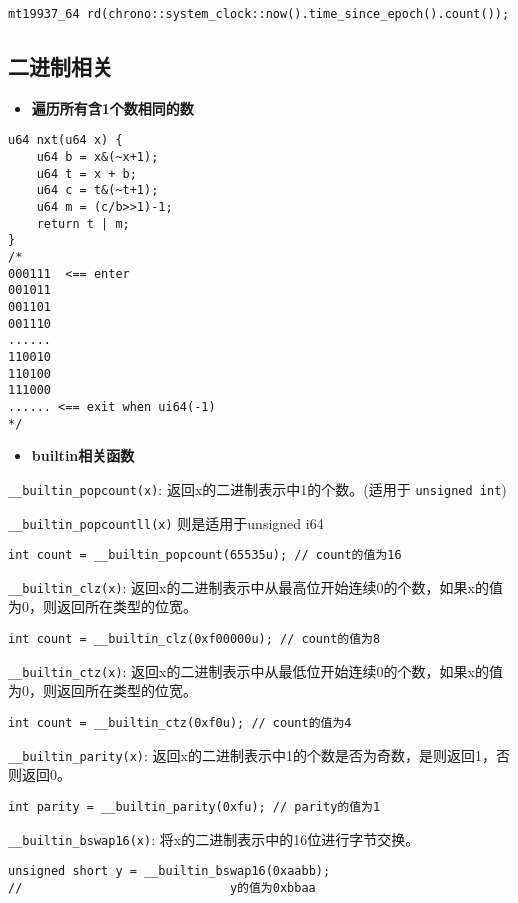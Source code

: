 \documentclass[a4paper,landscape,twocolumn]{ctexart}
\newcommand{\point}[1]{
	\begin{itemize}
		\item \textbf{#1}
	\end{itemize}
}
\begin{document}
\begin{lstlisting}
mt19937_64 rd(chrono::system_clock::now().time_since_epoch().count());
\end{lstlisting}

\subsection{二进制相关}

\point{遍历所有含1个数相同的数}

\begin{lstlisting}
u64 nxt(u64 x) {
	u64 b = x&(~x+1);
	u64 t = x + b;
	u64 c = t&(~t+1);
	u64 m = (c/b>>1)-1;
	return t | m;
}
/*
000111  <== enter
001011
001101
001110
......
110010
110100
111000
...... <== exit when ui64(-1)
*/
\end{lstlisting}

\point{builtin相关函数}

\texttt{\_\_builtin\_popcount(x)}: 返回x的二进制表示中1的个数。(适用于 \texttt{unsigned int})

\texttt{\_\_builtin\_popcountll(x)} 则是适用于unsigned i64

\begin{lstlisting}
int count = __builtin_popcount(65535u); // count的值为16
\end{lstlisting}

\texttt{\_\_builtin\_clz(x)}: 返回x的二进制表示中从最高位开始连续0的个数，如果x的值为0，则返回所在类型的位宽。

\begin{lstlisting}
int count = __builtin_clz(0xf00000u); // count的值为8
\end{lstlisting}

\texttt{\_\_builtin\_ctz(x)}: 返回x的二进制表示中从最低位开始连续0的个数，如果x的值为0，则返回所在类型的位宽。

\begin{lstlisting}
int count = __builtin_ctz(0xf0u); // count的值为4
\end{lstlisting}

\texttt{\_\_builtin\_parity(x)}: 返回x的二进制表示中1的个数是否为奇数，是则返回1，否则返回0。

\begin{lstlisting}
int parity = __builtin_parity(0xfu); // parity的值为1
\end{lstlisting}

\texttt{\_\_builtin\_bswap16(x)}: 将x的二进制表示中的16位进行字节交换。
\begin{lstlisting}
unsigned short y = __builtin_bswap16(0xaabb);
//                             y的值为0xbbaa
\end{lstlisting}
\end{document}
